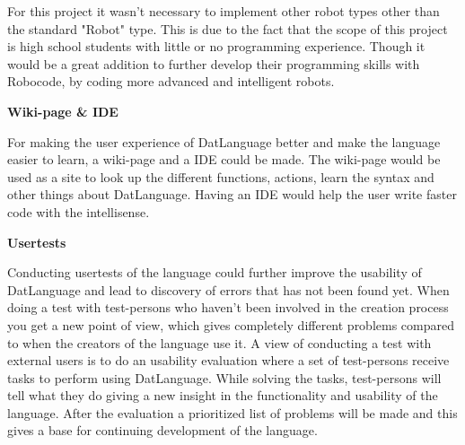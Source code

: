 For this project it wasn't necessary to implement other robot types other than the standard "Robot" type. This is due to the fact that the scope of this project is high school students with little or no programming experience. Though it would be a great addition to further develop their programming skills with Robocode, by coding more advanced and intelligent robots.\newline

\textbf{\Large{Wiki-page \& IDE}}

For making the user experience of DatLanguage better and make the language easier to learn, a wiki-page and a IDE could be made. The wiki-page would be used as a site to look up the different functions, actions, learn the syntax and other things about DatLanguage. Having an IDE would help the user write faster code with the intellisense.   

\textbf{\Large{Usertests}}

Conducting usertests of the language could further improve the usability of DatLanguage and lead to discovery of errors that has not been found yet. When doing a test with test-persons who haven't been involved in the creation process you get a new point of view, which gives completely different problems compared to when the creators of the language use it. 
A view of conducting a test with external users is to do an usability evaluation where a set of test-persons receive tasks to perform using DatLanguage. While solving the tasks, test-persons will tell what they do giving a new insight in the functionality and usability of the language. 
After the evaluation a prioritized list of problems will be made and this gives a base for continuing development of the language. 